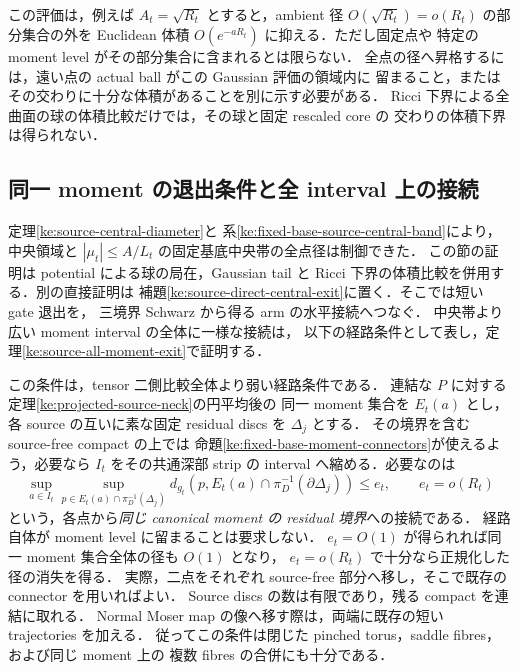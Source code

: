この評価は，例えば $A_t=\sqrt{R_t}$ とすると，ambient 径 $O(\sqrt{R_t})=o(R_t)$
の部分集合の外を Euclidean 体積 $O(e^{-aR_t})$ に抑える．ただし固定点や
特定の moment level がその部分集合に含まれるとは限らない．
全点の径へ昇格するには，遠い点の actual ball がこの Gaussian 評価の領域内に
留まること，またはその交わりに十分な体積があることを別に示す必要がある．
Ricci 下界による全曲面の球の体積比較だけでは，その球と固定 rescaled core の
交わりの体積下界は得られない．





\subsection{同一 moment の退出条件と全 interval 上の接続}

定理\ref{ke:source-central-diameter}と
系\ref{ke:fixed-base-source-central-band}により，中央領域と
$|\mu_t|\le A/L_t$ の固定基底中央帯の全点径は制御できた．
この節の証明は potential による球の局在，Gaussian tail と
Ricci 下界の体積比較を併用する．別の直接証明は
補題\ref{ke:source-direct-central-exit}に置く．そこでは短い gate 退出を，
三境界 Schwarz から得る arm の水平接続へつなぐ．
中央帯より広い moment interval の全体に一様な接続は，
以下の経路条件として表し，定理\ref{ke:source-all-moment-exit}で証明する．

この条件は，tensor 二側比較全体より弱い経路条件である．
連結な $P$ に対する定理\ref{ke:projected-source-neck}の円平均後の
同一 moment 集合を $E_t(a)$ とし，
各 source の互いに素な固定 residual discs を $\Delta_j$ とする．
その境界を含む source-free compact の上では
命題\ref{ke:fixed-base-moment-connectors}が使えるよう，必要なら
$I_t$ をその共通深部 strip の interval へ縮める．必要なのは
\begin{equation}\label{ke:eq:source-moment-exit-input}
 \sup_{a\in I_t}\sup_{p\in E_t(a)\cap\pi_D^{-1}(\Delta_j)}
 d_{g_t}\!\left(p,E_t(a)\cap\pi_D^{-1}(\partial\Delta_j)\right)
 \le e_t,\qquad e_t=o(R_t)
\end{equation}
という，各点から\emph{同じ canonical moment の residual 境界}への接続である．
経路自体が moment level に留まることは要求しない．
$e_t=O(1)$ が得られれば同一 moment 集合全体の径も $O(1)$ となり，
$e_t=o(R_t)$ で十分なら正規化した径の消失を得る．
実際，二点をそれぞれ source-free 部分へ移し，そこで既存の connector を用いればよい．
Source discs の数は有限であり，残る compact を連結に取れる．
Normal Moser map の像へ移す際は，両端に既存の短い trajectories を加える．
従ってこの条件は閉じた pinched torus，saddle fibres，および同じ moment 上の
複数 fibres の合併にも十分である．

